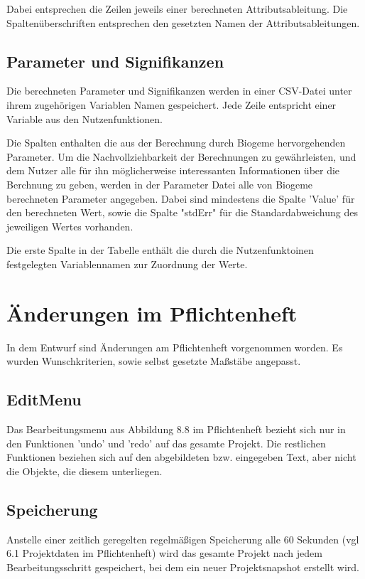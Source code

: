 \documentclass{article}
\begin{document}
Dabei entsprechen die Zeilen jeweils einer berechneten Attributsableitung. Die Spaltenüberschriften entsprechen den gesetzten Namen der Attributsableitungen. 

\subsection{Parameter und Signifikanzen}
Die berechneten Parameter und Signifikanzen werden in einer CSV-Datei unter ihrem zugehörigen Variablen Namen gespeichert. Jede Zeile entspricht einer Variable aus den Nutzenfunktionen.

Die Spalten enthalten die aus der Berechnung durch Biogeme hervorgehenden Parameter. Um die Nachvollziehbarkeit der Berechnungen zu gewährleisten, und dem Nutzer alle für ihn  möglicherweise interessanten Informationen über die Berchnung zu geben, werden in der Parameter Datei alle von Biogeme berechneten Parameter angegeben. Dabei sind mindestens die Spalte 'Value' für den berechneten Wert, sowie die Spalte "stdErr" für die Standardabweichung des jeweiligen Wertes vorhanden.

Die erste Spalte in der Tabelle enthält die durch die Nutzenfunktoinen festgelegten Variablennamen zur Zuordnung der Werte.


\section{Änderungen im Pflichtenheft}
In dem Entwurf sind Änderungen am Pflichtenheft vorgenommen worden. Es wurden Wunschkriterien, sowie selbst gesetzte Maßstäbe angepasst.

\subsection{EditMenu}
Das Bearbeitungsmenu aus Abbildung 8.8 im Pflichtenheft bezieht sich nur in den Funktionen 'undo' und 'redo' auf das gesamte Projekt. Die restlichen Funktionen beziehen sich auf den abgebildeten bzw. eingegeben Text, aber nicht die Objekte, die diesem unterliegen.

\subsection{Speicherung}
Anstelle einer zeitlich geregelten regelmäßigen Speicherung alle 60 Sekunden (vgl 6.1 Projektdaten im Pflichtenheft) wird das gesamte Projekt nach jedem Bearbeitungsschritt gespeichert, bei dem ein neuer Projektsnapshot erstellt wird.
\end{document}
